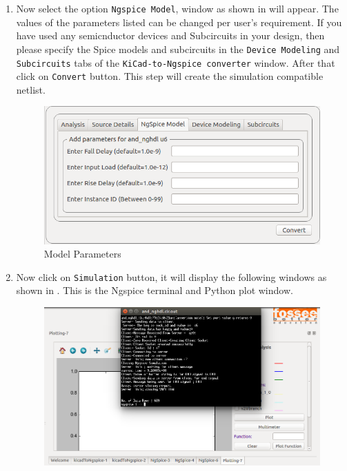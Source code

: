 \begin{enumerate}
\item Now select the option \texttt{Ngspice Model}, window as shown in  will appear. The values of the parameters listed can be changed per user's requirement. If you have used any semicnductor devices and Subcircuits in your design, then please specify the Spice models and subcircuits in the \texttt{Device Modeling} and \texttt{Subcircuits} tabs of the \texttt{KiCad-to-Ngspice converter} window.  After that click on \texttt{Convert} button. This step will create the simulation compatible netlist.
                    \begin{figure}[!htp]
                        \centering
                        \includegraphics[width =\hgfig]{./NGHDL/screen17.png} %
                        \caption{Model Parameters}
                        \label{screen17}
                    \end{figure}
\item Now click on \texttt{Simulation} button, it will display the following windows as shown in . This is the Ngspice terminal and Python plot window.
\begin{figure}[!htp]
                        \centering
                        \includegraphics[width =\hgfig]{./NGHDL/screen19.png}

\end{figure}
\end{enumerate}
